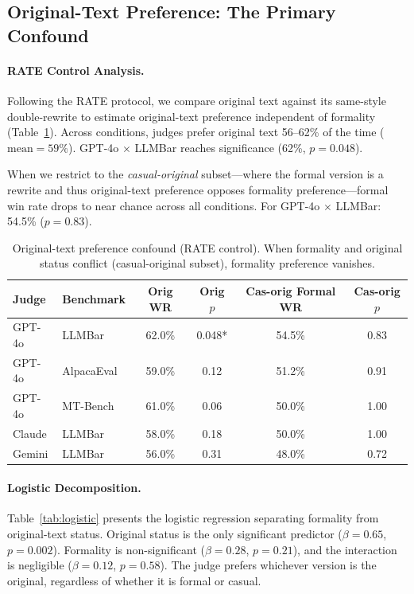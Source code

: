 \documentclass[11pt,a4paper]{article}
\begin{document}
\subsection{Original-Text Preference: The Primary Confound}
\label{sec:confound}

\paragraph{RATE Control Analysis.}
Following the RATE protocol, we compare original text against its same-style double-rewrite to estimate original-text preference independent of formality (Table~\ref{tab:rate_control}). Across conditions, judges prefer original text 56--62\% of the time ($\text{mean}=59\%$). GPT-4o $\times$ LLMBar reaches significance (62\%, $p=0.048$).

When we restrict to the \emph{casual-original} subset---where the formal version is a rewrite and thus original-text preference opposes formality preference---formal win rate drops to near chance across all conditions. For GPT-4o $\times$ LLMBar: 54.5\% ($p=0.83$).

\begin{table}[t]
\centering
\small
\caption{Original-text preference confound (RATE control). When formality and original status conflict (casual-original subset), formality preference vanishes.}
\label{tab:rate_control}
\begin{tabular}{llcccc}
\toprule
\textbf{Judge} & \textbf{Benchmark} & \textbf{Orig WR} & \textbf{Orig $p$} & \textbf{Cas-orig Formal WR} & \textbf{Cas-orig $p$} \\
\midrule
GPT-4o & LLMBar & 62.0\% & 0.048* & 54.5\% & 0.83 \\
GPT-4o & AlpacaEval & 59.0\% & 0.12 & 51.2\% & 0.91 \\
GPT-4o & MT-Bench & 61.0\% & 0.06 & 50.0\% & 1.00 \\
Claude & LLMBar & 58.0\% & 0.18 & 50.0\% & 1.00 \\
Gemini & LLMBar & 56.0\% & 0.31 & 48.0\% & 0.72 \\
\bottomrule
\end{tabular}
\end{table}

\paragraph{Logistic Decomposition.}
Table~\ref{tab:logistic} presents the logistic regression separating formality from original-text status. Original status is the only significant predictor ($\beta = 0.65$, $p = 0.002$). Formality is non-significant ($\beta = 0.28$, $p = 0.21$), and the interaction is negligible ($\beta = 0.12$, $p = 0.58$). The judge prefers whichever version is the original, regardless of whether it is formal or casual.
\end{document}
